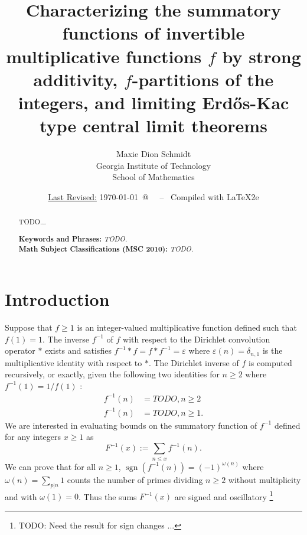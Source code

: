 \documentclass[11pt,reqno,a4letter]{article}
\title{
       \LARGE{
       Characterizing the summatory functions of invertible multiplicative functions $f$ 
       by strong additivity, $f$-partitions of the integers, and limiting Erd\H{o}s-Kac 
       type central limit theorems
       } 
}
\author{{\Large Maxie Dion Schmidt} \\ 
        {\normalsize Georgia Institute of Technology} \\[0.025cm] 
        {\normalsize School of Mathematics} 
}
\date{\small\underline{Last Revised:} \today \ @\ \hhmmsstime{} \ -- \ Compiled with \LaTeX2e}
\numberwithin{figure}{section}
\numberwithin{table}{section}
\theoremstyle{plain}
\numberwithin{theorem}{section}
\theoremstyle{definition}
\begin{document}
 

\maketitle

\begin{abstract} 
TODO... 

\bigskip 
\noindent
\textbf{Keywords and Phrases:} {\it TODO. } \\ 
\textbf{Math Subject Classifications (MSC 2010):} {\it TODO. } 
\end{abstract} 

\newpage
\section{Introduction} 
\label{Section_Intro} 

Suppose that $f \geq 1$ is an integer-valued multiplicative function defined such that 
$f(1) = 1$. The inverse $f^{-1}$ of $f$ with respect to the Dirichlet convolution operator 
$\ast$ exists and satisfies $f^{-1} \ast f = f \ast f^{-1} = \varepsilon$ where 
$\varepsilon(n) = \delta_{n,1}$ is the multiplicative identity with respect to $\ast$. 
The Dirichlet inverse of $f$ is computed recursively, or exactly, given the 
following two identities for $n \geq 2$ where $f^{-1}(1) = 1 / f(1)$ 
\cite[\S TODO]{APOSTOL-ANUMT} \cite{MOUSAVI-SCHMIDT}: 
\begin{align*}
f^{-1}(n) & = TODO, n \geq 2 \\ 
f^{-1}(n) & = TODO, n \geq 1. 
\end{align*}
We are interested in evaluating bounds on the summatory function of $f^{-1}$ defined for any 
integers $x \geq 1$ as 
\[
F^{-1}(x) := \sum_{n \leq x} f^{-1}(n). 
\]
We can prove that for all $n \geq 1$, $\operatorname{sgn}(f^{-1}(n)) = (-1)^{\omega(n)}$ where 
$\omega(n) = \sum_{p|n} 1$ counts the number of primes dividing $n \geq 2$ without multiplicity 
and with $\omega(1) = 0$. Thus the sums $F^{-1}(x)$ are signed and oscillatory \footnote{
    TODO: Need the result for sign changes ... 
}
\end{document}
